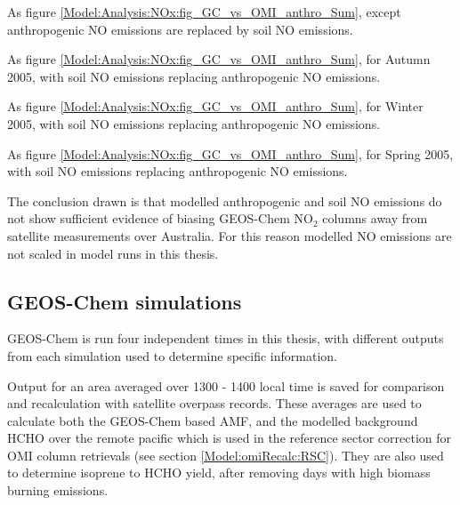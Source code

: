     {As figure \ref{Model:Analysis:NOx:fig_GC_vs_OMI_anthro_Sum}, except anthropogenic NO emissions are replaced by soil NO emissions.}
    {\label{Model:Analysis:NOx:fig_GC_vs_OMI_soil_Sum}}
    
    {As figure \ref{Model:Analysis:NOx:fig_GC_vs_OMI_anthro_Sum}, for Autumn 2005, with soil NO emissions replacing anthropogenic NO emissions.}
    {\label{Model:Analysis:NOx:fig_GC_vs_OMI_soil_Aut}}
    
    {As figure \ref{Model:Analysis:NOx:fig_GC_vs_OMI_anthro_Sum}, for Winter 2005, with soil NO emissions replacing anthropogenic NO emissions.}
    {\label{Model:Analysis:NOx:fig_GC_vs_OMI_soil_Win}}
    
    {As figure \ref{Model:Analysis:NOx:fig_GC_vs_OMI_anthro_Sum}, for Spring 2005, with soil NO emissions replacing anthropogenic NO emissions.}
    {\label{Model:Analysis:NOx:fig_GC_vs_OMI_soil_Spr}}
    
    The conclusion drawn is that modelled anthropogenic and soil NO emissions do not show sufficient evidence of biasing GEOS-Chem NO$_2$ columns away from satellite measurements over Australia.
    For this reason modelled NO emissions are not scaled in model runs in this thesis.
  
  \subsection{GEOS-Chem simulations}
    \label{Model:GC:runs}
    
    GEOS-Chem is run four independent times in this thesis, with different outputs from each simulation used to determine specific information. 
    
    Output for an area averaged over 1300 - 1400 local time is saved for comparison and recalculation with satellite overpass records.
    These averages are used to calculate both the GEOS-Chem based AMF, and the modelled background HCHO over the remote pacific which is used in the reference sector correction for OMI column retrievals (see section \ref{Model:omiRecalc:RSC}).
    They are also used to determine isoprene to HCHO yield, after removing days with high biomass burning emissions.

